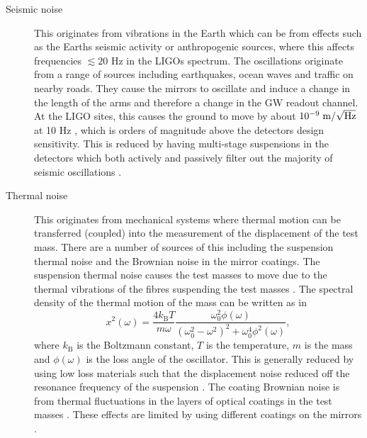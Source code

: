 \begin{description}
\item[Seismic noise] This originates from vibrations in the Earth which can be from effects such as the Earths seismic
activity or anthropogenic sources, where this affects frequencies $\lesssim 20$ Hz in the \glspl{LIGO} spectrum. The oscillations originate
from a range of sources including earthquakes, ocean waves and traffic on nearby roads. They cause the mirrors to
oscillate and induce a change
in the length of the arms and therefore a change in the \gls{GW} readout channel. 
At the \gls{LIGO} sites, this causes the ground to move by about $10^{-9}\; \rm{m}/\sqrt{\rm{Hz}}$ at 10 Hz \citep{martynov2016SensitivityAdvanced}, which is orders of magnitude above the detectors design sensitivity. 
This is reduced by having multi-stage suspensions in the detectors which both actively and passively filter out the majority of seismic oscillations
\citep{matichard2015SeismicIsolation}.


\item[Thermal noise] This originates from mechanical systems where thermal
motion can be transferred (coupled) into the measurement of the displacement of
the test mass. There are a number of sources of this including the suspension
thermal noise and the Brownian noise in the mirror coatings.  The suspension
thermal noise causes the test masses to move due to the thermal vibrations of
the fibres suspending the test masses \citep{gonzalez2007HandbookApproximation}.  
The spectral density of the thermal motion of the mass can be written as in \citep{pitkin2011GravitationalWave}
\begin{equation}
	x^2(\omega) = \frac{4k_{\text{B}}T}{m \omega }\frac{\omega_0^2 \phi(\omega)}{(\omega_0^2 - \omega^2)^2 + \omega_0^4 \phi^2(\omega)},
\end{equation}
where $k_{\text{B}}$ is the Boltzmann constant, $T$ is the temperature, $m$ is the mass and $\phi(\omega)$ is the loss angle of the oscillator.
This is generally reduced by using low loss materials such that the displacement noise reduced off the resonance frequency of the suspension \citep{hammond2012ReducingSuspension}.
The coating Brownian noise is from thermal fluctuations in the layers of optical coatings in the test masses
\citep{martynov2016SensitivityAdvanced}. These effects are limited by using
different coatings on the mirrors \citep{abernathy0OverviewResearch,martin2008MeasurementsLowtemperature}.


\end{description}
